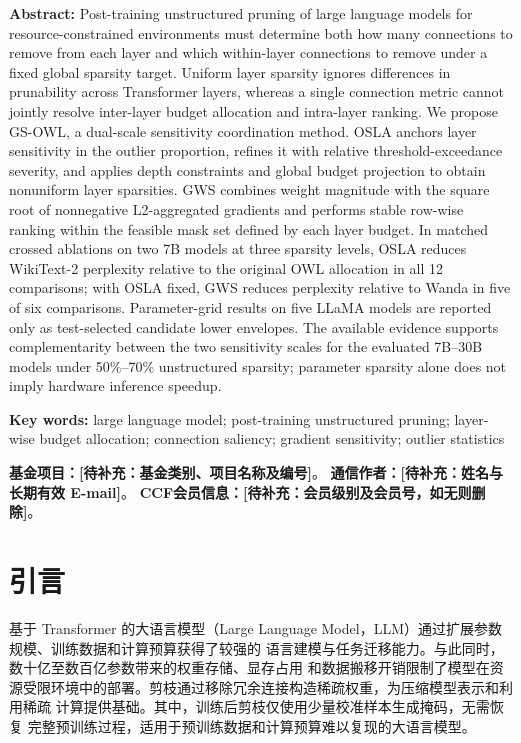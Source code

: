 \documentclass[UTF8,fontset=fandol]{ctexart}
\newcommand{\placeholder}[1]{\textbf{[待补充：#1]}}
\begin{document}
\vspace{4pt}
\noindent\textbf{Abstract:}
Post-training unstructured pruning of large language models for resource-constrained environments must determine both how many connections to remove from each layer and which within-layer connections to remove under a fixed global sparsity target. Uniform layer sparsity ignores differences in prunability across Transformer layers, whereas a single connection metric cannot jointly resolve inter-layer budget allocation and intra-layer ranking. We propose GS-OWL, a dual-scale sensitivity coordination method. OSLA anchors layer sensitivity in the outlier proportion, refines it with relative threshold-exceedance severity, and applies depth constraints and global budget projection to obtain nonuniform layer sparsities. GWS combines weight magnitude with the square root of nonnegative L2-aggregated gradients and performs stable row-wise ranking within the feasible mask set defined by each layer budget. In matched crossed ablations on two 7B models at three sparsity levels, OSLA reduces WikiText-2 perplexity relative to the original OWL allocation in all 12 comparisons; with OSLA fixed, GWS reduces perplexity relative to Wanda in five of six comparisons. Parameter-grid results on five LLaMA models are reported only as test-selected candidate lower envelopes. The available evidence supports complementarity between the two sensitivity scales for the evaluated 7B--30B models under 50\%--70\% unstructured sparsity; parameter sparsity alone does not imply hardware inference speedup.

\noindent\textbf{Key words:}
large language model; post-training unstructured pruning; layer-wise budget allocation; connection saliency; gradient sensitivity; outlier statistics

\vspace{6pt}
\noindent{}
\textbf{基金项目：}\placeholder{基金类别、项目名称及编号}。\quad
\textbf{通信作者：}\placeholder{姓名与长期有效 E-mail}。\quad
\textbf{CCF会员信息：}\placeholder{会员级别及会员号，如无则删除}。
\vspace{4pt}
\endgroup
\vspace{8pt}

\section{引言}

基于 Transformer 的大语言模型（Large Language Model，LLM）通过扩展参数规模、训练数据和计算预算获得了较强的
语言建模与任务迁移能力\cite{llama,llama2,transformer}。与此同时，数十亿至数百亿参数带来的权重存储、显存占用
和数据搬移开销限制了模型在资源受限环境中的部署。剪枝通过移除冗余连接构造稀疏权重，为压缩模型表示和利用稀疏
计算提供基础\cite{obd,obs,han2015,deepcompression}。其中，训练后剪枝仅使用少量校准样本生成掩码，无需恢复
完整预训练过程，适用于预训练数据和计算预算难以复现的大语言模型。
\end{document}
